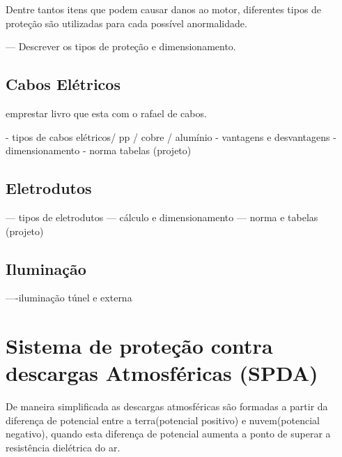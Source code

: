 Dentre tantos itens que podem causar danos ao motor, diferentes tipos de proteção são utilizadas para cada possível anormalidade.

--- Descrever os tipos de proteção e dimensionamento.





\subsection{Cabos Elétricos}

emprestar livro que esta com o rafael  de cabos. 

- tipos de cabos elétricos/ pp / cobre / alumínio 
- vantagens e desvantagens
- dimensionamento
- norma tabelas (projeto)

\subsection{Eletrodutos}

--- tipos de eletrodutos
--- cálculo e dimensionamento
--- norma e tabelas (projeto)



\subsection{Iluminação}

----iluminação túnel e externa


\section{Sistema de proteção contra descargas Atmosféricas (SPDA)}

De maneira simplificada as descargas atmosféricas são formadas a partir da diferença de potencial entre a terra(potencial positivo) e nuvem(potencial negativo), quando esta diferença de potencial aumenta a ponto de superar a resistência dielétrica do ar. %

